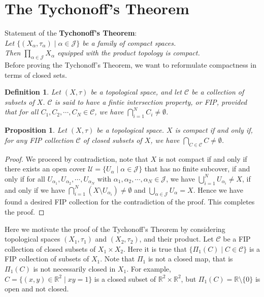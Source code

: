 \documentclass[11pt]{book}
\theoremstyle{break}
\theoremstyle{break}
\newtheorem{prop}[lem]{Proposition}
\newtheorem{defn}{Definition}[corL]
\newcommand{\R}{\mathbb{R}}
\begin{document}
\newpage
\section[The Tychonoff's Theorem]{\color{red}The Tychonoff's Theorem\color{black}}
Statement of the \textbf{Tychonoff's Theorem}:\\
\textit{Let $\{(X_\alpha,\tau_\alpha) \mid \alpha \in \mathcal{J}\}$ be a family of compact spaces. \\Then $\prod_{\alpha \in \mathcal{J}}X_\alpha$ equipped with the product topology is compact. }\\


Before proving the Tychonoff's Theorem, we want to reformulate compactness in terms of closed sets.

\begin{defn}
Let $(X,\tau)$ be a topological space, and let $\mathcal{C}$ be a collection of subsets of $X$. $\mathcal{C}$ is said to have a fintie intersection property, or FIP, provided that for all $C_1,C_2,\cdots, C_N \in \mathcal{C}$, we have $\bigcap_{i=1}^N C_i \neq \emptyset$. 
\end{defn}

\begin{prop}
Let $(X,\tau)$ be a topological space. $X$ is compact if and only if, for any FIP collection $\mathcal{C}$ of closed subsets of $X$, we have $\bigcap_{C\in \mathcal{C}}C \neq \emptyset$. 
\end{prop}
\begin{proof}
We proceed by contradiction, note that $X$ is not compact if and only if there exists an open cover $\mathcal{U} = \{U_\alpha \mid \alpha \in \mathcal{J}\}$ that has no finite subcover, if and only if for all $U_{\alpha_1}, U_{\alpha_2}, \cdots, U_{\alpha_N}$ with $\alpha_1,\alpha_2,\cdots, \alpha_N \in \mathcal{J}$, we have $\bigcup_{i=1}^N U_{\alpha_i} \neq X$, if and only if we have $\bigcap_{i=1}^N (X\setminus U_{\alpha_i}) \neq \emptyset$ and $\bigcup_{\alpha \in \mathcal{J}}U_\alpha = X$. Hence we have found a desired FIP collection for the contradiction of the proof. This completes the proof.
\end{proof}

Here we motivate the proof of the Tychonoff's Theorem by considering topological spaces $(X_1,\tau_1)$ and $(X_2,\tau_2)$, and their product. Let $\mathcal{C}$ be a FIP collection of closed subsets of $X_1\times X_2$. Here it is true that $\{\Pi_1(C) \mid C\in \mathcal{C}\}$ is a FIP collection of subsets of $X_1$. Note that $\Pi_1$ is not a closed map, that is $\Pi_1(C)$ is not necessarily closed in $X_1$. For example, $C = \{(x,y) \in \R^2 \mid xy=1 \}$ is a closed subset of $\R^2 \times \R^2$, but $\Pi_1(C ) = \R \setminus \{0\}$ is open and not closed. \\
\end{document}
